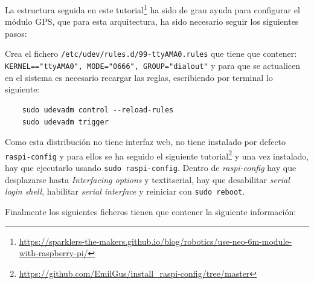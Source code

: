 La estructura seguida en este tutorial\footnote{\url{https://sparklers-the-makers.github.io/blog/robotics/use-neo-6m-module-with-raspberry-pi/}} ha sido de gran ayuda para configurar el módulo \acs{GPS}, que para esta arquitectura, ha sido necesario seguir los siguientes pasos: 

Crea el fichero \verb|/etc/udev/rules.d/99-ttyAMA0.rules| que tiene que contener: \verb|KERNEL=="ttyAMA0", MODE="0666", GROUP="dialout"| y para que se actualicen en el sistema es necesario recargar las reglas, escribiendo por terminal lo siguiente: 

\begin{verbatim}
	sudo udevadm control --reload-rules
	sudo udevadm trigger
\end{verbatim}

Como esta distribución no tiene interfaz web, no tiene instalado por defecto \verb|raspi-config| y para ellos se ha seguido el siguiente tutorial\footnote{\url{https://github.com/EmilGus/install_raspi-config/tree/master}} y una vez instalado, hay que ejecutarlo usando \verb|sudo raspi-config|. Dentro de \textit{raspi-config} hay que desplazarse hasta \textit{Interfacing options} y textit{serial}, hay que desabilitar \textit{serial login shell}, habilitar \textit{serial interface} y reiniciar con \verb|sudo reboot|.

Finalmente los siguientes ficheros tienen que contener la siguiente información: 


